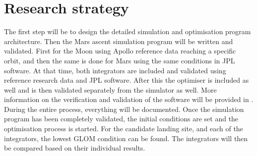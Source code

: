 \section{Research strategy}
\label{sec:resstrat_fin}
The first step will be to design the detailed simulation and optimisation program architecture. Then the Mars ascent simulation program will be written and validated. First for the Moon using Apollo reference data reaching a specific orbit, and then the same is done for Mars using the same conditions in \ac{JPL} software. At that time, both integrators are included and validated using reference research data and \ac{JPL} software. After this the optimiser is included as well and is then validated separately from the simulator as well. More information on the verification and validation of the software will be provided in . During the entire process, everything will be documented. Once the simulation program has been completely validated, the initial conditions are set and the optimisation process is started. For the candidate landing site, and each of the integrators, the lowest \ac{GLOM} condition can be found. The integrators will then be compared based on their individual results.





